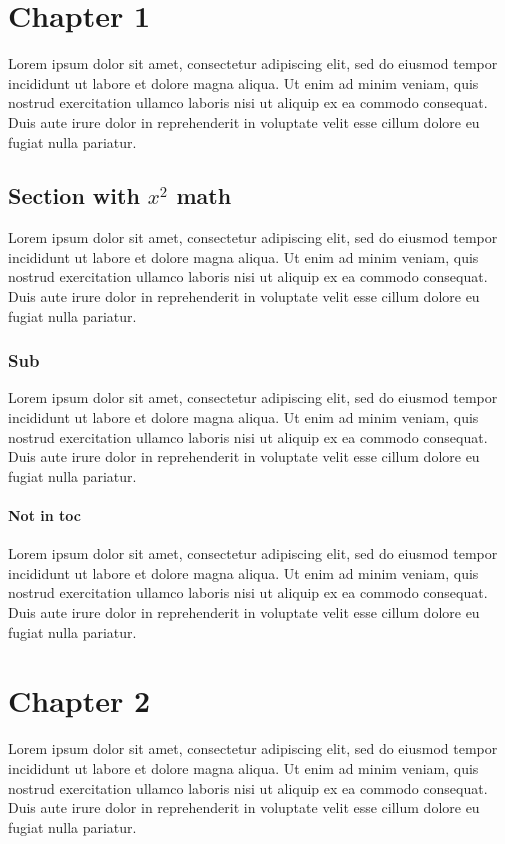 \documentclass{report}
\begin{document}
\tableofcontents
\chapter{Chapter 1}
Lorem ipsum dolor sit amet, consectetur adipiscing elit, sed do eiusmod tempor incididunt ut labore et dolore magna aliqua. Ut enim ad minim veniam, quis nostrud exercitation ullamco laboris nisi ut aliquip ex ea commodo consequat. Duis aute irure dolor in reprehenderit in voluptate velit esse cillum dolore eu fugiat nulla pariatur.

\section{Section with $x^2$ math}
Lorem ipsum dolor sit amet, consectetur adipiscing elit, sed do eiusmod tempor incididunt ut labore et dolore magna aliqua. Ut enim ad minim veniam, quis nostrud exercitation ullamco laboris nisi ut aliquip ex ea commodo consequat. Duis aute irure dolor in reprehenderit in voluptate velit esse cillum dolore eu fugiat nulla pariatur.

\subsection{Sub}
Lorem ipsum dolor sit amet, consectetur adipiscing elit, sed do eiusmod tempor incididunt ut labore et dolore magna aliqua. Ut enim ad minim veniam, quis nostrud exercitation ullamco laboris nisi ut aliquip ex ea commodo consequat. Duis aute irure dolor in reprehenderit in voluptate velit esse cillum dolore eu fugiat nulla pariatur.

\subsubsection{Not in toc}
Lorem ipsum dolor sit amet, consectetur adipiscing elit, sed do eiusmod tempor incididunt ut labore et dolore magna aliqua. Ut enim ad minim veniam, quis nostrud exercitation ullamco laboris nisi ut aliquip ex ea commodo consequat. Duis aute irure dolor in reprehenderit in voluptate velit esse cillum dolore eu fugiat nulla pariatur.

\chapter{Chapter 2}
Lorem ipsum dolor sit amet, consectetur adipiscing elit, sed do eiusmod tempor incididunt ut labore et dolore magna aliqua. Ut enim ad minim veniam, quis nostrud exercitation ullamco laboris nisi ut aliquip ex ea commodo consequat. Duis aute irure dolor in reprehenderit in voluptate velit esse cillum dolore eu fugiat nulla pariatur.
\end{document}
